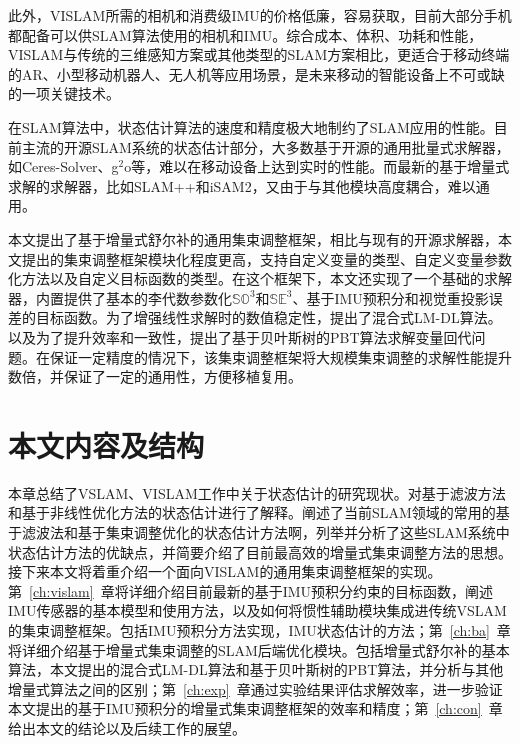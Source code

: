 此外，VISLAM所需的相机和消费级IMU的价格低廉，容易获取，目前大部分手机都配备可以供SLAM算法使用的相机和IMU。综合成本、体积、功耗和性能，VISLAM与传统的三维感知方案或其他类型的SLAM方案相比，更适合于移动终端的AR、小型移动机器人、无人机等应用场景，是未来移动的智能设备上不可或缺的一项关键技术。

在SLAM算法中，状态估计算法的速度和精度极大地制约了SLAM应用的性能。目前主流的开源SLAM系统的状态估计部分，大多数基于开源的通用批量式求解器，如Ceres-Solver\citep{ceres-solver}、g$^2$o\citep{kummerle2011g}等，难以在移动设备上达到实时的性能。而最新的基于增量式求解的求解器，比如SLAM++\citep{ila2017fast}和iSAM2\citep{kaess2012isam2}，又由于与其他模块高度耦合，难以通用。

本文提出了基于增量式舒尔补的通用集束调整框架，相比与现有的开源求解器，本文提出的集束调整框架模块化程度更高，支持自定义变量的类型、自定义变量参数化方法以及自定义目标函数的类型。在这个框架下，本文还实现了一个基础的求解器，内置提供了基本的李代数参数化$\mathbb{SO}^3$和$\mathbb{SE}^3$、基于IMU预积分和视觉重投影误差的目标函数。为了增强线性求解时的数值稳定性，提出了混合式LM-DL算法。以及为了提升效率和一致性，提出了基于贝叶斯树的PBT算法求解变量回代问题。在保证一定精度的情况下，该集束调整框架将大规模集束调整的求解性能提升数倍，并保证了一定的通用性，方便移植复用。




\section{本文内容及结构}

本章总结了VSLAM、VISLAM工作中关于状态估计的研究现状。对基于滤波方法和基于非线性优化方法的状态估计进行了解释。阐述了当前SLAM领域的常用的基于滤波法和基于集束调整优化的状态估计方法啊，列举并分析了这些SLAM系统中状态估计方法的优缺点，并简要介绍了目前最高效的增量式集束调整方法的思想。接下来本文将着重介绍一个面向VISLAM的通用集束调整框架的实现。第~\ref{ch:vislam}~章将详细介绍目前最新的基于IMU预积分约束的目标函数，阐述IMU传感器的基本模型和使用方法，以及如何将惯性辅助模块集成进传统VSLAM的集束调整框架。包括IMU预积分方法实现，IMU状态估计的方法；第~\ref{ch:ba}~章将详细介绍基于增量式集束调整的SLAM后端优化模块。包括增量式舒尔补的基本算法，本文提出的混合式LM-DL算法和基于贝叶斯树的PBT算法，并分析与其他增量式算法之间的区别；第~\ref{ch:exp}~章通过实验结果评估求解效率，进一步验证本文提出的基于IMU预积分的增量式集束调整框架的效率和精度；第~\ref{ch:con}~章给出本文的结论以及后续工作的展望。
